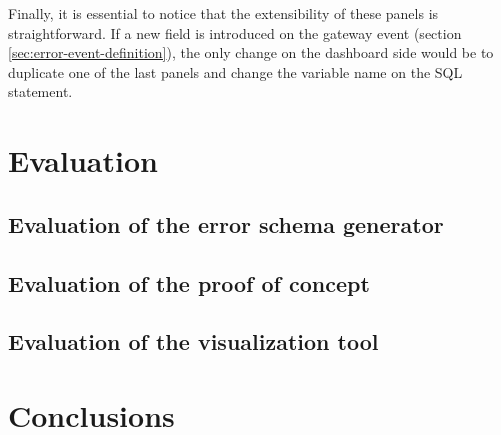 \documentclass[english, 12pt, a4paper, sci, utf8, a-1b, online]{aaltothesis}
\begin{document}
Finally, it is essential to notice that the extensibility of these panels is straightforward. If a new field is introduced on the gateway event (section \ref{sec:error-event-definition}), the only change on the dashboard side would be to duplicate one of the last panels and change the variable name on the SQL statement.

\clearpage
\section{Evaluation}


\subsection{Evaluation of the error schema generator} 


\subsection{Evaluation of the proof of concept}


\subsection{Evaluation of the visualization tool}


\clearpage
\section{Conclusions}




\clearpage
\thesisbibliography



\end{document}
